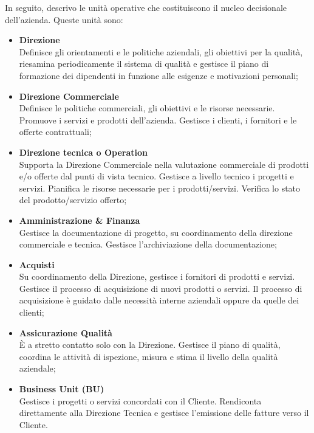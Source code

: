 In seguito, descrivo le unità operative che costituiscono il nucleo 
decisionale dell'azienda. Queste unità sono:
\begin{itemize}
	\item \textbf{Direzione}\\ 
	Definisce gli orientamenti e le politiche aziendali, gli 
	obiettivi per la qualità, riesamina periodicamente il sistema di 
	qualità e gestisce il piano di formazione dei dipendenti in funzione 
	alle esigenze e motivazioni personali;
	
	\item \textbf{Direzione Commerciale}\\
	Definisce le politiche commerciali, gli obiettivi e le risorse 
	necessarie. Promuove i servizi e prodotti dell'azienda. Gestisce i 
	clienti, i fornitori e le offerte contrattuali;
	
	\item \textbf{Direzione tecnica o Operation}\\
	Supporta la Direzione Commerciale nella valutazione commerciale di 
	prodotti e/o offerte dal punti di vista tecnico. Gestisce a livello 
	tecnico i progetti e servizi. Pianifica le risorse necessarie per 
	i prodotti/servizi. Verifica lo stato del prodotto/servizio offerto;	
	
	\item \textbf{Amministrazione \& Finanza}\\
	Gestisce la documentazione di progetto, su coordinamento della direzione 
	commerciale e tecnica. Gestisce l'archiviazione della documentazione;
	
	\item \textbf{Acquisti}\\
	Su coordinamento della Direzione, gestisce i fornitori di prodotti e 
	servizi. Gestisce il processo di acquisizione di nuovi prodotti o 
	servizi. Il processo di acquisizione è guidato dalle necessità 
	interne aziendali oppure da quelle dei clienti;
	
	\item \textbf{Assicurazione Qualità}\\
	È a stretto contatto solo con la Direzione. Gestisce il piano di 
    qualità, coordina le attività di ispezione, misura e stima il livello 
	della qualità aziendale;
	
	\item \textbf{Business Unit (BU)}\\
	Gestisce i progetti o servizi concordati con il Cliente. Rendiconta 
	direttamente alla Direzione Tecnica e gestisce l'emissione delle 
	fatture verso il Cliente. 
\end{itemize}


